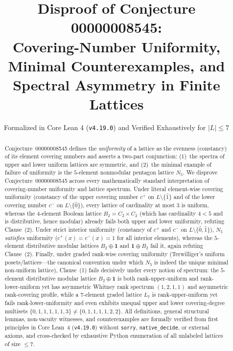 \documentclass[11pt,a4paper]{article}
\title{\textbf{Disproof of Conjecture 00000008545:\\
Covering-Number Uniformity, Minimal Counterexamples, and\\
Spectral Asymmetry in Finite Lattices}}
\author{Formalized in Core Lean 4 (\texttt{v4.19.0}) and Verified Exhaustively for $|L| \le 7$}
\date{}
\theoremstyle{definition}
\theoremstyle{remark}
\begin{document}
\maketitle

\begin{abstract}
Conjecture~00000008545 defines the \emph{uniformity} of a lattice as the evenness (constancy) of its element covering numbers and asserts a two-part conjunction: (1)~the spectra of upper and lower uniform lattices are symmetric, and (2)~the minimal example of failure of uniformity is the $5$-element nonmodular pentagon lattice $N_5$. We disprove Conjecture~00000008545 across every mathematically standard interpretation of covering-number uniformity and lattice spectrum. Under literal element-wise covering uniformity (constancy of the upper covering number $c^+$ on $L \setminus \{\hat{1}\}$ and of the lower covering number $c^-$ on $L \setminus \{\hat{0}\}$), every lattice of cardinality at most $3$ is uniform, whereas the $4$-element Boolean lattice $B_2 = C_2 \times C_2$ (which has cardinality $4 < 5$ and is distributive, hence modular) already fails both upper and lower uniformity, refuting Clause~(2). Under strict interior uniformity (constancy of $c^+$ and $c^-$ on $L \setminus \{\hat{0}, \hat{1}\}$), $N_5$ \emph{satisfies} uniformity ($c^+(x) = c^-(x) = 1$ for all interior elements), whereas the $5$-element distributive modular lattices $B_2 \oplus \mathbf{1}$ and $\mathbf{1} \oplus B_2$ fail it, again refuting Clause~(2). Finally, under graded rank-wise covering uniformity (Terwilliger's uniform posets/lattices---the canonical convention under which $N_5$ is indeed the unique minimal non-uniform lattice), Clause~(1) fails decisively under every notion of spectrum: the $5$-element distributive modular lattice $B_2 \oplus \mathbf{1}$ is both rank-upper-uniform and rank-lower-uniform yet has asymmetric Whitney rank spectrum $(1,2,1,1)$ and asymmetric rank-covering profile, while a $7$-element graded lattice $L_7$ is rank-upper-uniform yet fails rank-lower-uniformity and even exhibits unequal upper and lower covering-degree multisets $\{0,1,1,1,1,1,3\} \neq \{0,1,1,1,1,2,2\}$. All definitions, general structural lemmas, non-vacuity witnesses, and counterexamples are formally verified from first principles in Core Lean~4 (\texttt{v4.19.0}) without \texttt{sorry}, \texttt{native\_decide}, or external axioms, and cross-checked by exhaustive Python enumeration of all unlabeled lattices of size $\le 7$.
\end{abstract}
\end{document}
